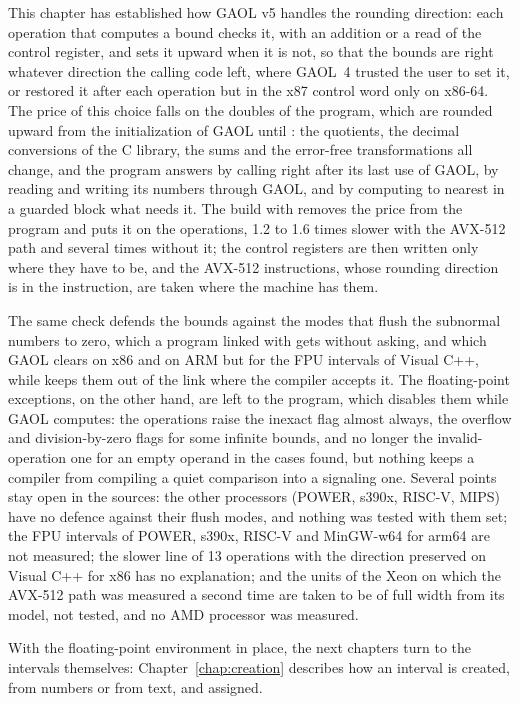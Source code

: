 This chapter has established how GAOL v5 handles the rounding direction: each
operation that computes a bound checks it, with an addition or a read of the
control register, and sets it upward when it is not, so that the bounds are right whatever direction the calling
code left, where GAOL~4 trusted the user to set it, or restored it after each
operation but in the x87 control word only on x86-64. The price of this choice
falls on the doubles of the program, which are rounded upward from the
initialization of GAOL until : the quotients, the decimal
conversions of the C library, the sums and the error-free transformations all
change, and the program answers by calling  right after its
last use of GAOL, by reading and writing its numbers through GAOL, and by
computing to nearest in a guarded block what needs it. The build with
 removes the price from the program and puts
it on the operations, 1.2 to 1.6 times slower with the AVX-512 path and
several times without it; the control registers are then written only where
they have to be, and the AVX-512 instructions, whose rounding direction is in
the instruction, are taken where the machine has them.

\medskip
The same check defends the bounds against the modes that flush the subnormal
numbers to zero, which a program linked with  gets without
asking, and which GAOL clears on x86 and on ARM but for the FPU intervals of
Visual C++, while 
keeps them out of the link where the compiler accepts it. The floating-point
exceptions, on the other hand, are left to the program, which disables them
while GAOL computes: the operations raise the inexact flag almost always, the
overflow and division-by-zero flags for some infinite bounds, and no longer the
invalid-operation one for an empty operand in the cases found, but nothing
keeps a compiler from compiling a quiet comparison into a signaling one.
Several points stay open in the sources: the other processors (POWER, s390x,
RISC-V, MIPS) have no defence against their flush modes, and nothing was
tested with them set; the FPU intervals of POWER, s390x, RISC-V and
MinGW-w64 for arm64 are not measured; the slower line of 13 operations with
the direction preserved on Visual C++ for x86 has no explanation; and the
units of the Xeon on which the AVX-512 path was measured a second time are
taken to be of full width from its model, not tested, and no AMD processor
was measured.

\medskip
With the floating-point environment in place, the next chapters turn to the
intervals themselves: Chapter~\ref{chap:creation} describes how an interval
is created, from numbers or from text, and assigned.
